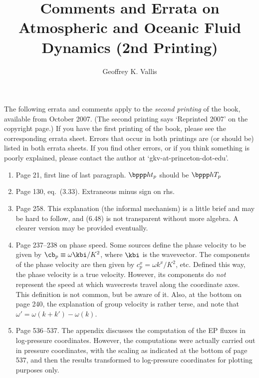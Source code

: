 \documentclass[10pt]{article}
\newcommand{\eq}{eq.\ } \newcommand{\Eq}{Eq.\ }
\begin{document}
\title{\sffamily Comments and Errata on Atmospheric and Oceanic Fluid Dynamics (2nd Printing)}
\author{\sffamily Geoffrey K. Vallis}
\maketitle
%

\noindent 


The following errata and comments apply to the \emph{second printing} of the book, available from October 2007. (The second printing says `Reprinted 2007' on the copyright page.) If you have the first printing of the book, please see the corresponding errata sheet. Errors that occur in both printings are (or should be) listed in both errata sheets. If you find other errors, or if you think something is poorly explained, please contact the author at `gkv-at-princeton-dot-edu'. 

\begin{enumerate}

\item Page 21, first line of last paragraph. $\bppp h t _p$ should be $\bppp hT_p$

\item Page 130, \eq (3.33). Extraneous minus sign on rhs.

\item \label{informal} Page 258. This explanation (the informal mechanism) is a little brief and may be hard to follow, and (6.48) is not transparent without more algebra. A clearer version may be provided eventually. 

\item Page 237--238 on phase speed. Some sources define the phase velocity to be given by $\cb_p \equiv \omega \kbi / K^2$, where $\kbi$ is the wavevector. The components of the phase velocity are then given by $c^x_p = \omega k^x/K^2$, etc. Defined this way, the phase velocity is a true velocity. However, its components do \emph{not} represent the speed at which wavecrests travel along the coordinate axes. This definition is not common, but be aware of it. Also, at the bottom on page 240, the explanation of group velocity is rather terse, and note that ${\omega'} = \omega(k+k') - \omega(k)$.

\item Page 536--537. The appendix discusses the computation of the EP fluxes in log-pressure coordinates. However, the computations were actually carried out in pressure coordinates, with the scaling as indicated at the bottom of page 537, and then the results transformed to log-pressure coordinates for plotting purposes only. 

\end{enumerate}
\end{document}
